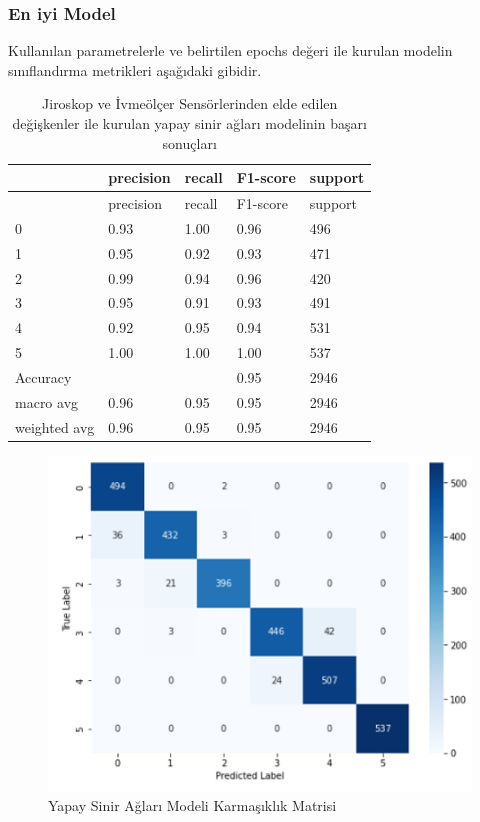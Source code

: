 \documentclass[12pt,twoside]{deuthesis}
\begin{document}
\hypertarget{en-iyi-model-14}{%
\subsubsection{En iyi Model}\label{en-iyi-model-14}}

Kullanılan parametrelerle ve belirtilen epochs değeri ile kurulan modelin sınıflandırma metrikleri aşağıdaki gibidir.
\begin{longtable}[]{@{}lllll@{}}
\caption{\label{tab:jiysa} Jiroskop ve İvmeölçer Sensörlerinden elde edilen değişkenler ile kurulan yapay sinir ağları modelinin başarı sonuçları}\tabularnewline
\toprule()
& precision & recall & F1-score & support \\
\midrule()
\endfirsthead
\toprule()
& precision & recall & F1-score & support \\
\midrule()
\endhead
0 & 0.93 & 1.00 & 0.96 & 496 \\
1 & 0.95 & 0.92 & 0.93 & 471 \\
2 & 0.99 & 0.94 & 0.96 & 420 \\
3 & 0.95 & 0.91 & 0.93 & 491 \\
4 & 0.92 & 0.95 & 0.94 & 531 \\
5 & 1.00 & 1.00 & 1.00 & 537 \\
Accuracy & & & 0.95 & 2946 \\
macro avg & 0.96 & 0.95 & 0.95 & 2946 \\
weighted avg & 0.96 & 0.95 & 0.95 & 2946 \\
\bottomrule()
\end{longtable}
\begin{figure}

{\centering \includegraphics[width=0.6\linewidth,height=0.35\textheight]{figure/jiysa_confmat} 

}

\caption{Yapay Sinir Ağları Modeli Karmaşıklık Matrisi}\label{fig:jiysaconfmat}
\end{figure}
\end{document}
